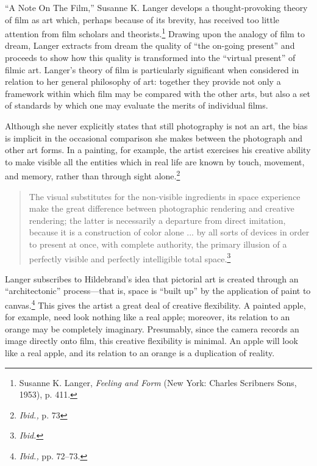 \documentclass{tufte-handout}
\begin{document}
\begin{titlepage}
\vspace*{1em}


 ``A Note On The Film,'' Susanne K. Langer develops a
thought-provoking theory of film as art which, perhaps because of its
brevity, has received too little attention from film scholars and
theorists.\footnote{Susanne K. Langer, \emph{Feeling and Form} (New
  York: Charles Scribners Sons, 1953), p. 411.} Draw­ing upon the analogy
of film to dream, Langer extracts from dream the quality of ``the
on-going present'' and proceeds to show how this quality is transformed
into the ``virtual present'' of filmic art. Langer's theory of film is
particularly significant when considered in relation to her general
philos­ophy of art: together they provide not only a framework within
which film may be compared with the other arts, but also a set of
standards by which one may evaluate the merits of individual films.

Although she never explicitly states that still photography is not an
art, the bias is implicit in the occasional comparison she makes between
the photograph and other art forms. In a painting, for example, the
artist exer­cises his creative ability to make visible all the entities
which in real life are known by touch, movement, and memory, rather than
through sight alone.\footnote{\emph{Ibid.,} p. 73}

\begin{quote}
The visual substitutes for the non-visible ingredients in space
experience make the great difference between photographic rendering and
creative rendering; the latter is necessarily a departure from direct
imitation, because it is a construction of color alone ... by all sorts
of devices in order to present at once, with complete authority, the
primary illusion of a perfectly visible and perfectly intelligible total
space.\footnote{\emph{Ibid.}}
\end{quote}

\noindent Langer subscribes to Hildebrand's idea that pictorial art is created
through an ``architectonic'' process---that is, space is ``built up'' by
the application of paint to canvas.\footnote{\emph{Ibid.,} pp. 72--73.}
This gives the artist a great deal of creative flexibility. A painted
apple, for example, need look nothing like a real apple; moreover, its
relation to an orange may be completely imaginary. Presumably, since the
camera records an image directly onto film, this creative flexibility is
minimal. An apple will look like a real apple, and its relation to an
orange is a duplication of reality.

\enlargethispage{2\baselineskip}

\vspace*{2em}



 \end{titlepage}
\end{document}
